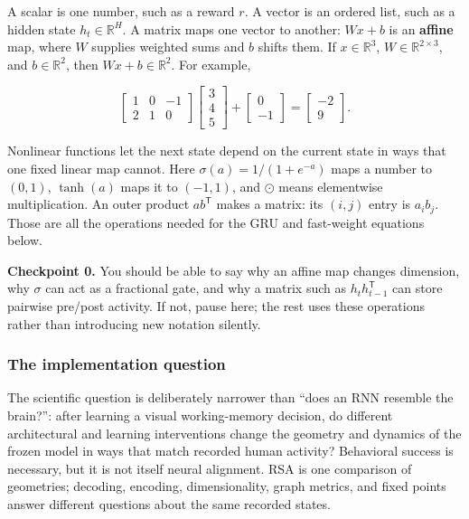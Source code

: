 \documentclass[
  10pt,
]{article}
\begin{document}
A scalar is one number, such as a reward \(r\). A vector is an ordered
list, such as a hidden state \(h_t\in\mathbb R^H\). A matrix maps one
vector to another: \(Wx+b\) is an \textbf{affine} map, where \(W\)
supplies weighted sums and \(b\) shifts them. If \(x\in\mathbb R^3\),
\(W\in\mathbb R^{2\times3}\), and \(b\in\mathbb R^2\), then
\(Wx+b\in\mathbb R^2\). For example,

\[
\begin{bmatrix}1&0&-1\\2&1&0\end{bmatrix}
\begin{bmatrix}3\\4\\5\end{bmatrix}+
\begin{bmatrix}0\\-1\end{bmatrix}
=\begin{bmatrix}-2\\9\end{bmatrix}.
\]

Nonlinear functions let the next state depend on the current state in
ways that one fixed linear map cannot. Here \(\sigma(a)=1/(1+e^{-a})\)
maps a number to \((0,1)\), \(\tanh(a)\) maps it to \((-1,1)\), and
\(\odot\) means elementwise multiplication. An outer product
\(ab^{\mathsf T}\) makes a matrix: its \((i,j)\) entry is \(a_i b_j\).
Those are all the operations needed for the GRU and fast-weight
equations below.

\textbf{Checkpoint 0.} You should be able to say why an affine map
changes dimension, why \(\sigma\) can act as a fractional gate, and why
a matrix such as \(h_t h_{t-1}^{\mathsf T}\) can store pairwise pre/post
activity. If not, pause here; the rest uses these operations rather than
introducing new notation silently.

\hypertarget{the-implementation-question}{%
\subsubsection{The implementation
question}\label{the-implementation-question}}

The scientific question is deliberately narrower than ``does an RNN
resemble the brain?'': after learning a visual working-memory decision,
do different architectural and learning interventions change the
geometry and dynamics of the frozen model in ways that match recorded
human activity? Behavioral success is necessary, but it is not itself
neural alignment. RSA is one comparison of geometries; decoding,
encoding, dimensionality, graph metrics, and fixed points answer
different questions about the same recorded states.
\end{document}
